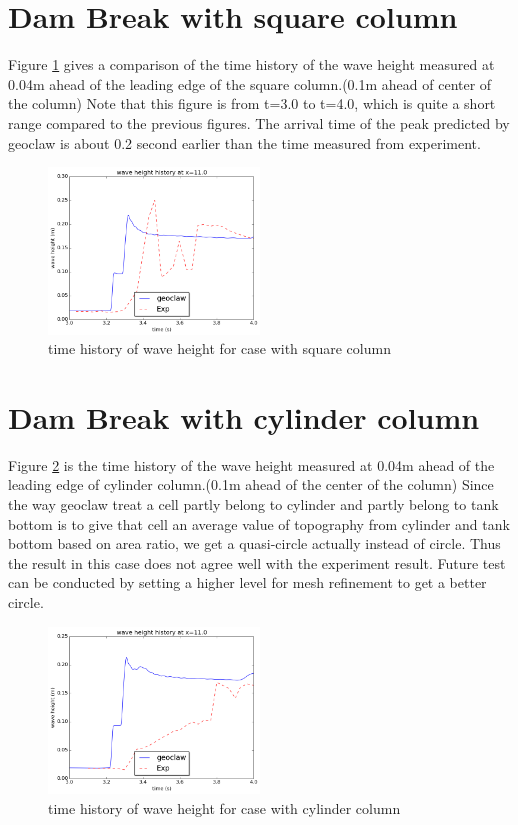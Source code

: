 \documentclass[11pt]{article}
\begin{document}
\section{Dam Break with square column}\label{Sec:Square}
Figure \ref{fig:waveheight_square_x=11.0} gives a comparison of the time history of the wave height measured at 0.04m ahead of the leading edge of the square column.(0.1m ahead of center of the column)
Note that this figure is from t=3.0 to t=4.0, which is quite a short range compared to the previous figures.
The arrival time of the peak predicted by geoclaw is about 0.2 second earlier than the time measured from experiment. 
\begin{figure}[h!]
    \centering
    \includegraphics[width=0.5\textwidth]{../../dambreak/myplot/waveheight_square_x=11}
    \caption{time history of wave height for case with square column}
    \label{fig:waveheight_square_x=11.0}
\end{figure}



\section{Dam Break with cylinder column}\label{Sec:Cylinder}
Figure \ref{fig:waveheight_cylinder_x=11.0} is the time history of the wave height measured at 0.04m ahead of the leading edge of cylinder column.(0.1m ahead of the center of the column)
Since the way geoclaw treat a cell partly belong to cylinder and partly belong to tank bottom is to give that cell an average value of topography from cylinder and tank bottom based on area ratio, we get a quasi-circle actually instead of circle. Thus the result in this case does not agree well with the experiment result. 
Future test can be conducted by setting a higher level for mesh refinement to get a better circle.
\begin{figure}[h!]
    \centering
    \includegraphics[width=0.5\textwidth]{../../dambreak/myplot/waveheight_cylinder_x=11}
    \caption{time history of wave height for case with cylinder column}
    \label{fig:waveheight_cylinder_x=11.0}
\end{figure}
\end{document}
